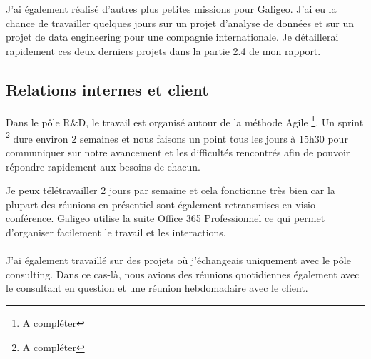 J’ai également réalisé d’autres plus petites missions pour Galigeo. J’ai eu la chance de travailler quelques jours sur un projet d’analyse de données et sur un projet de data engineering pour une compagnie internationale. Je détaillerai rapidement ces deux derniers projets dans la partie 2.4 de mon rapport.


\subsection{Relations internes et client}

Dans le pôle R\&D, le travail est organisé autour de la méthode Agile \footnote{A compléter}. Un sprint \footnote{A compléter} dure environ 2 semaines et nous faisons un point tous les jours à 15h30 pour communiquer sur notre avancement et les difficultés rencontrés afin de pouvoir répondre rapidement aux besoins de chacun.

Je peux télétravailler 2 jours par semaine et cela fonctionne très bien car la plupart des réunions en présentiel sont également retransmises en visio-conférence. Galigeo utilise la suite Office 365 Professionnel ce qui permet d’organiser facilement le travail et les interactions.

\paragraph*{}

J’ai également travaillé sur des projets où j’échangeais uniquement avec le pôle consulting. Dans ce cas-là, nous avions des réunions quotidiennes également avec le consultant en question et une réunion hebdomadaire avec le client.
